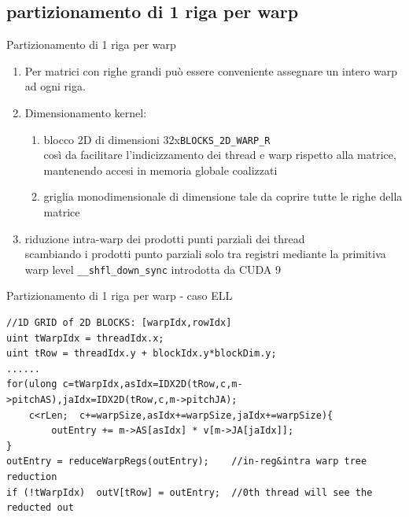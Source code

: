 \documentclass[aspectratio=1610]{beamer}
\newcommand{\vvv}[1]{{\small\texttt{#1}}}
\begin{document}
\subsection{partizionamento di 1 riga per warp} 
\begin{frame}{Partizionamento di 1 riga per warp} 
	\begin{enumerate}
		\item	Per matrici con righe grandi può essere conveniente assegnare 
				un intero warp ad ogni riga.
		\pause
		\item	Dimensionamento kernel:	
		\begin{enumerate}
			\item 	blocco 2D di dimensioni 32x\vvv{BLOCKS\_2D\_WARP\_R}\\
			\pause
					così da facilitare l'indicizzamento dei thread e warp rispetto alla matrice,\\
					mantenendo accesi in memoria globale coalizzati	
			\pause
			\item	griglia monodimensionale di dimensione tale da coprire tutte le righe della matrice 
		\end{enumerate}
		\pause
		\item 	riduzione intra-warp dei prodotti punti parziali dei thread\\
				scambiando i prodotti punto parziali solo tra registri
				\pause
				mediante la primitiva warp level \vvv{\_\_shfl\_down\_sync} introdotta da CUDA 9 
	\end{enumerate}
\end{frame}

\begin{frame}[fragile]{Partizionamento di 1 riga per warp - caso ELL} 
\begin{lstlisting}
//1D GRID of 2D BLOCKS: [warpIdx,rowIdx]
uint tWarpIdx = threadIdx.x;
uint tRow = threadIdx.y + blockIdx.y*blockDim.y;
......
for(ulong c=tWarpIdx,asIdx=IDX2D(tRow,c,m->pitchAS),jaIdx=IDX2D(tRow,c,m->pitchJA);     
    c<rLen;  c+=warpSize,asIdx+=warpSize,jaIdx+=warpSize){                     
        outEntry += m->AS[asIdx] * v[m->JA[jaIdx]];                            
}       
outEntry = reduceWarpRegs(outEntry);    //in-reg&intra warp tree reduction     
if (!tWarpIdx)  outV[tRow] = outEntry;  //0th thread will see the reducted out 
\end{lstlisting}
\end{frame}
\end{document}
